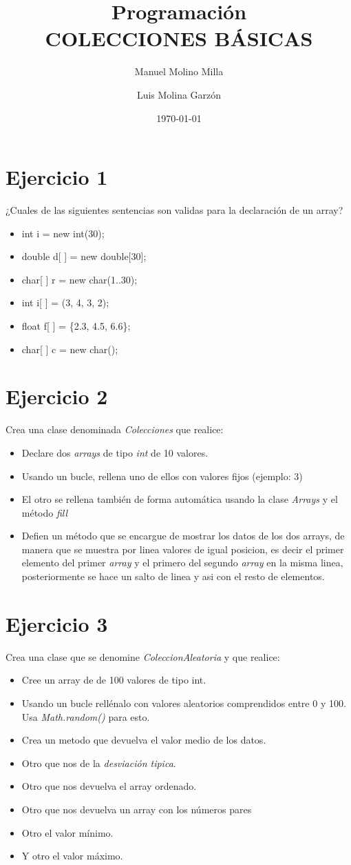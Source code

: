 \documentclass[4paper]{article}
\author{Manuel Molino Milla \and Luis Molina Garzón}
\title{\textbf{Programación}
\\COLECCIONES BÁSICAS}
\date{\today}
\begin{document}
\maketitle


\section*{Ejercicio 1}
¿Cuales de las siguientes sentencias son validas para la declaración de un array?
\begin{itemize}
\item int i = new int(30);
\item double d[ ] = new double[30];
\item char[ ] r = new char(1..30);
\item int i[ ] = (3, 4, 3, 2);
\item float f[ ] = \{2.3, 4.5, 6.6\};
\item char[ ] c = new char();
\end{itemize}

\section*{Ejercicio 2}
Crea una clase denominada \emph{Colecciones} que realice:
\begin{itemize}
\item Declare dos \emph{arrays} de tipo \emph{int} de 10 valores.
\item Usando un bucle, rellena uno de ellos con valores fijos (ejemplo: 3)
\item El otro se rellena también de forma automática usando la clase \emph{Arrays} y el método \emph{fill}
\item Defien un método que se encargue de mostrar los datos de los dos arrays, de manera que se muestra por linea valores de igual posicion, es decir el primer elemento del primer \emph{array} y el primero del segundo \emph{array} en la misma linea, posteriormente se hace un salto de linea y asi con el resto de elementos. 
\end{itemize}

\section*{Ejercicio 3}
Crea una clase que se denomine \emph{ColeccionAleatoria} y que realice:
\begin{itemize}
\item Cree un array de de 100 valores de tipo int.
\item Usando un bucle rellénalo con valores aleatorios comprendidos entre 0 y 100. Usa \emph{Math.random()} para esto.
\item Crea un metodo que devuelva el valor medio de los datos.
\item Otro que nos de la \emph{desviación tipica}.
\item Otro que nos devuelva el array ordenado.
\item Otro que nos devuelva un array con los números pares
\item Otro el valor mínimo.
\item Y otro el valor máximo.
\end{itemize}
\end{document}
